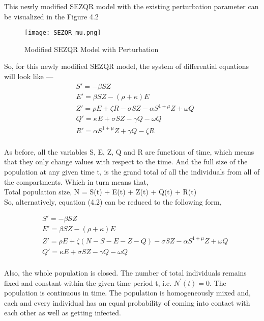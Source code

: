 This newly modified SEZQR model with the existing perturbation parameter can be visualized in the Figure 4.2
\begin{figure}[h]
\centering
\texttt{[image: SEZQR\_mu.png]}
\caption{Modified SEZQR Model with Perturbation}
\label{fig:Modified SEZQR Model}
\end{figure}

So, for this newly modified SEZQR model, the system of differential equations will look like --- 
\begin{equation}  \label{eq:ModSEZQR}
\begin{split}
& S' = - \beta SZ \\
& E' = \beta SZ - (\rho + \kappa)E \\
& Z' = \rho E + \zeta R - \sigma SZ - \alpha S^{1 + \mu} Z + \omega Q \\
& Q' = \kappa E + \sigma SZ - \gamma Q - \omega Q \\
& R' = \alpha S^{1 + \mu} Z + \gamma Q - \zeta R \\
\end{split}
\end{equation}

As before, all the variables S, E, Z, Q and R are functions of time, which means that they only change values with respect to the time. And the full size of the population at any given time t, is the grand total of all the individuals from all of the compartments. Which in turn means that, \\

\noindent Total population size, N = S(t) + E(t) + Z(t) + Q(t) + R(t) \\

\noindent So, alternatively, equation (4.2) can be reduced to the following form,

\begin{equation}  \label{eq:ModSEZQR_reduced}
\begin{split}
& S' = - \beta SZ \\
& E' = \beta SZ - (\rho + \kappa)E \\
& Z' = \rho E + \zeta (N - S - E - Z - Q) - \sigma SZ - \alpha S^{1 + \mu} Z + \omega Q \\
& Q' = \kappa E + \sigma SZ - \gamma Q - \omega Q \\
\end{split}
\end{equation}

Also, the whole population is closed. The number of total individuals remains fixed and constant within the given time period t, i.e. $ N^\prime (t) = 0 $. The population is continuous in time. The population is homogeneously mixed and, each and every individual has an equal probability of coming into contact with each other as well as getting infected. \\

